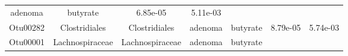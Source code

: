 \documentclass[11pt,]{article}
\begin{document}
\begin{longtable}[]{@{}ccccccc@{}}
\begin{minipage}[t]{0.09\columnwidth}
adenoma\strut
\end{minipage} & \begin{minipage}[t]{0.11\columnwidth}\centering\strut
butyrate\strut
\end{minipage} & \begin{minipage}[t]{0.09\columnwidth}\centering\strut
6.85e-05\strut
\end{minipage} & \begin{minipage}[t]{0.09\columnwidth}\centering\strut
5.11e-03\strut
\end{minipage}\tabularnewline
\begin{minipage}[t]{0.09\columnwidth}\centering\strut
Otu00282\strut
\end{minipage} & \begin{minipage}[t]{0.17\columnwidth}\centering\strut
Clostridiales\strut
\end{minipage} & \begin{minipage}[t]{0.17\columnwidth}\centering\strut
Clostridiales\strut
\end{minipage} & \begin{minipage}[t]{0.09\columnwidth}\centering\strut
adenoma\strut
\end{minipage} & \begin{minipage}[t]{0.11\columnwidth}\centering\strut
butyrate\strut
\end{minipage} & \begin{minipage}[t]{0.09\columnwidth}\centering\strut
8.79e-05\strut
\end{minipage} & \begin{minipage}[t]{0.09\columnwidth}\centering\strut
5.74e-03\strut
\end{minipage}\tabularnewline
\begin{minipage}[t]{0.09\columnwidth}\centering\strut
Otu00001\strut
\end{minipage} & \begin{minipage}[t]{0.17\columnwidth}\centering\strut
Lachnospiraceae\strut
\end{minipage} & \begin{minipage}[t]{0.17\columnwidth}\centering\strut
Lachnospiraceae\strut
\end{minipage} & \begin{minipage}[t]{0.09\columnwidth}\centering\strut
adenoma\strut
\end{minipage} & \begin{minipage}[t]{0.11\columnwidth}\centering\strut
butyrate\strut
\end{minipage} & \begin{minipage}[t]{0.09\columnwidth}\centering\strut

\end{minipage}
\end{longtable}
\end{document}
